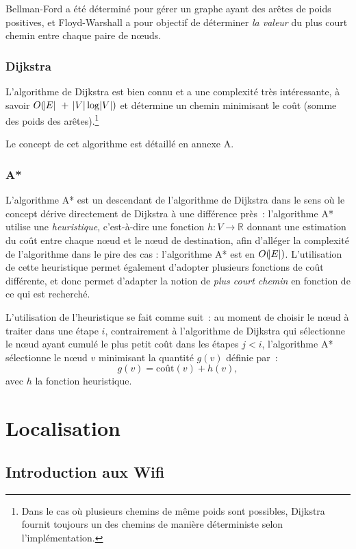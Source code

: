 \documentclass[10pt,journal,compsoc]{IEEEtran}
\newcommand{\R}{\mathbb R}
\begin{document}
	Bellman-Ford a été déterminé pour gérer un graphe ayant des arêtes de poids positives, et Floyd-Warshall a pour objectif de déterminer \textit{la valeur}
	du plus court chemin entre chaque paire de nœuds.
    \subsubsection{Dijkstra}
	  L'algorithme de Dijkstra est bien connu et a une complexité très intéressante, à savoir $O(\abs E~+~\abs V\log\abs V)$ et détermine un chemin minimisant
	  le coût (somme des poids des arêtes).\footnote{Dans le cas où plusieurs chemins de même poids sont possibles, Dijkstra fournit toujours un des chemins de
	  manière déterministe selon l'implémentation.}

	  Le concept de cet algorithme est détaillé en annexe A.
    \subsubsection{A*}
	  L'algorithme A* est un descendant de l'algorithme de Dijkstra dans le sens où le concept dérive directement de Dijkstra à une différence près~:
	  l'algorithme A* utilise une \textit{heuristique}, c'est-à-dire une fonction $h : V \to \R$ donnant une estimation du coût entre chaque nœud et le nœud
	  de destination, afin d'alléger la complexité de l'algorithme dans le pire des cas : l'algorithme A* est en $O(\abs E)$. L'utilisation de cette
	  heuristique permet également d'adopter plusieurs fonctions de coût différente, et donc permet d'adapter la notion de \textit{plus court chemin} en fonction
	  de ce qui est recherché.

	  L'utilisation de l'heuristique se fait comme suit~: au moment de choisir le nœud à traiter dans une étape $i$, contrairement à l'algorithme de Dijkstra qui
	  sélectionne le nœud ayant cumulé le plus petit coût dans les étapes $j < i$, l'algorithme A* sélectionne le nœud $v$ minimisant la quantité $g(v)$ définie
	  par~:
	  \begin{equation}
	  	g(v) = \text{coût}(v) + h(v),
	  \end{equation}
	  avec $h$ la fonction heuristique.
\section{Localisation}
  \subsection{Introduction aux Wifi}
\end{document}
